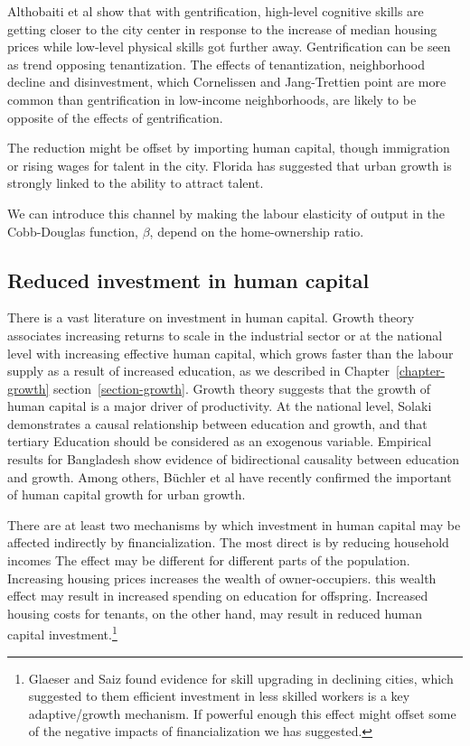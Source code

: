 Althobaiti et al \cite{althobaitiHousingPricesSkills2021}  show that with gentrification, high-level cognitive skills are getting closer to the city center in response to the increase of median housing prices while low-level physical skills got further away.  Gentrification can be seen as trend opposing tenantization. The effects of tenantization, neighborhood decline and disinvestment, which Cornelissen and Jang-Trettien \cite{cornelissenHousingContextNeighborhood2023} point  are more common than gentrification in low-income neighborhoods, are likely to be opposite of the effects of  gentrification.

The reduction might be offset by importing human capital, though immigration or rising wages for talent in the city. Florida\cite{floridaCompetingAgeTalent2005, floridaCreativeClassEconomic2014} has suggested that urban growth is strongly linked to the ability to attract talent. 

We can introduce this channel by making  the labour elasticity of output in the Cobb-Douglas function, $\beta$, depend on the home-ownership ratio.  


\subsection{Reduced investment in human capital}

There is a vast literature on investment in human capital. 
Growth theory associates increasing returns to scale in the industrial sector or at the national level with increasing effective human capital, which grows faster than the labour supply as a result of increased education, as we described in Chapter~\ref{chapter-growth} section~\ref{section-growth}. 
Growth theory suggests that the growth of human capital is  a major driver of productivity.  At the national level, Solaki \cite{solakiRelationshipEducationGDP2013} demonstrates a causal relationship between education and growth, and that tertiary Education should be considered as an exogenous variable.  Empirical results for Bangladesh \cite{islam2007relationship}show evidence of bidirectional causality between education and growth.  Among others, B\"uchler et al have recently confirmed the important of human capital growth for urban growth.

There are at least two mechanisms by which investment in human capital may be affected indirectly by financialization. The most direct is by reducing household incomes The effect may be different for different parts of the population. Increasing housing prices increases the wealth of owner-occupiers. this wealth effect may result in increased spending on education for offspring. Increased housing costs for tenants, on the other hand,  may result in reduced human capital investment.\footnote{Glaeser and Saiz found evidence for skill upgrading in declining cities, which suggested to them efficient investment in less skilled workers is a key adaptive/growth mechanism. If powerful enough this effect might offset some of the negative impacts of financialization we has suggested.}  

